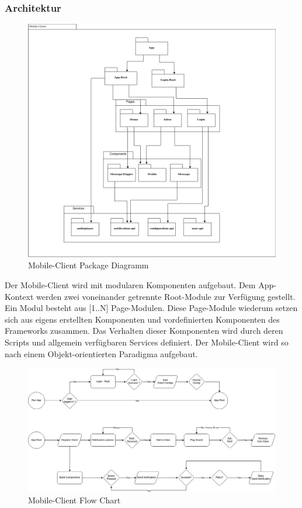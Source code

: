 \subsubsection{Architektur}
\begin{figure}[h]
    \label{fig:mobileClient-packages}
    \includegraphics[width=\linewidth]{graphics/MobileClient-Architecture-export}
    \caption[Mobile-Client Package Diagramm]{Mobile-Client Package Diagramm}
\end{figure}

Der Mobile-Client wird mit modularen Komponenten aufgebaut.
Dem App-Kontext werden zwei voneinander getrennte Root-Module zur Verfügung gestellt.
Ein Modul besteht aus [1..N] Page-Modulen.
Diese Page-Module wiederum setzen sich aus eigens erstellten Komponenten und vordefinierten Komponenten des Frameworks zusammen.
Das Verhalten dieser Komponenten wird durch deren Scripts und allgemein verfügbaren Services definiert.
Der Mobile-Client wird so nach einem Objekt-orientierten Paradigma aufgebaut.

\clearpage

\begin{figure}[h]
    \label{fig:mobileClient-flow}
    \includegraphics[width=\linewidth]{graphics/MobileClient-Flow-export}
    \caption[Mobile-Client Flow Chart]{Mobile-Client Flow Chart}
\end{figure}

